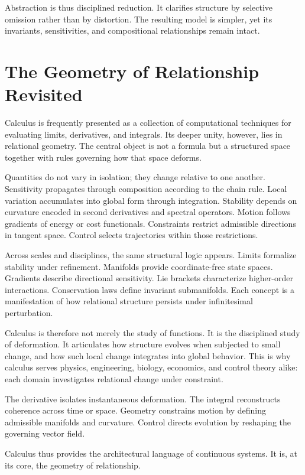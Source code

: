 \documentclass[12pt]{book}
\begin{document}
Abstraction is thus disciplined reduction. It clarifies structure by
selective omission rather than by distortion. The resulting model
is simpler, yet its invariants, sensitivities, and compositional
relationships remain intact.

\section{The Geometry of Relationship Revisited}

Calculus is frequently presented as a collection of computational
techniques for evaluating limits, derivatives, and integrals.
Its deeper unity, however, lies in relational geometry. The central
object is not a formula but a structured space together with rules
governing how that space deforms.

Quantities do not vary in isolation; they change relative to one
another. Sensitivity propagates through composition according to the
chain rule. Local variation accumulates into global form through
integration. Stability depends on curvature encoded in second
derivatives and spectral operators. Motion follows gradients of energy
or cost functionals. Constraints restrict admissible directions in
tangent space. Control selects trajectories within those restrictions.

Across scales and disciplines, the same structural logic appears.
Limits formalize stability under refinement. Manifolds provide
coordinate-free state spaces. Gradients describe directional
sensitivity. Lie brackets characterize higher-order interactions.
Conservation laws define invariant submanifolds. Each concept is a
manifestation of how relational structure persists under infinitesimal
perturbation.

Calculus is therefore not merely the study of functions. It is the
disciplined study of deformation. It articulates how structure evolves
when subjected to small change, and how such local change integrates
into global behavior. This is why calculus serves physics, engineering,
biology, economics, and control theory alike: each domain investigates
relational change under constraint.

The derivative isolates instantaneous deformation. The integral
reconstructs coherence across time or space. Geometry constrains
motion by defining admissible manifolds and curvature. Control directs
evolution by reshaping the governing vector field.

Calculus thus provides the architectural language of continuous
systems. It is, at its core, the geometry of relationship.
\end{document}
